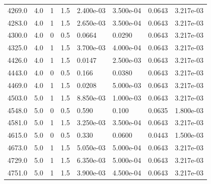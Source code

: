 \documentclass[preview]{standalone}
\begin{document}
{{{\begin{tabular}{L{1.2cm}C{1.2cm} C{0.3cm}C{0.5cm} C{1.4cm}C{1.4cm} C{1.4cm}C{1.4cm}}
  4269.0  &   4.0  & 1     & 1.5 &  2.400e-03  & 3.500e-04  & 0.0643 &  3.217e-03   \\ 
  4283.0  &   4.0  & 1     & 1.5 &  2.650e-03  & 3.500e-04  & 0.0643 &  3.217e-03   \\ 
  4300.0  &   4.0  & 0     & 0.5 &  0.0664  & 0.0290  & 0.0643 &  3.217e-03   \\ 
  4325.0  &   4.0  & 1     & 1.5 &  3.700e-03  & 4.000e-04  & 0.0643 &  3.217e-03   \\ 
  4426.0  &   4.0  & 1     & 1.5 &  0.0147  & 2.500e-03  & 0.0643 &  3.217e-03   \\ 
  4443.0  &   4.0  & 0     & 0.5 &  0.166  & 0.0380  & 0.0643 &  3.217e-03   \\ 
  4469.0  &   4.0  & 1     & 1.5 &  0.0208  & 5.000e-03  & 0.0643 &  3.217e-03   \\ 
  4503.0  &   5.0  & 1     & 1.5 &  8.850e-03  & 1.000e-03  & 0.0643 &  3.217e-03   \\ 
  4548.0  &   5.0  & 0     & 0.5 &  0.590  & 0.100  & 0.0635 &  1.800e-03   \\ 
  4581.0  &   5.0  & 1     & 1.5 &  3.250e-03  & 3.500e-04  & 0.0643 &  3.217e-03   \\ 
  4615.0  &   5.0  & 0     & 0.5 &  0.330  & 0.0600  & 0.0443 &  1.500e-03   \\ 
  4673.0  &   5.0  & 1     & 1.5 &  5.050e-03  & 5.000e-04  & 0.0643 &  3.217e-03   \\ 
  4729.0  &   5.0  & 1     & 1.5 &  6.350e-03  & 5.000e-04  & 0.0643 &  3.217e-03   \\ 
  4751.0  &   5.0  & 1     & 1.5 &  3.900e-03  & 4.500e-04  & 0.0643 &  3.217e-03   \\ 
\hline 
\end{tabular} 

}}}
\end{document}
